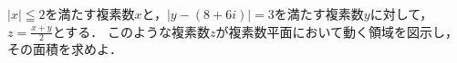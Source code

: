 \documentclass[../../main.tex]{subfiles}
\begin{document}
$|x|\leqq2$を満たす複素数$x$と，$|y-(8+6i)|=3$を満たす複素数$y$に対して，
$\displaystyle z=\frac{x+y}{2}$とする．
このような複素数$z$が複素数平面において動く領域を図示し，その面積を求めよ．
\end{document}
